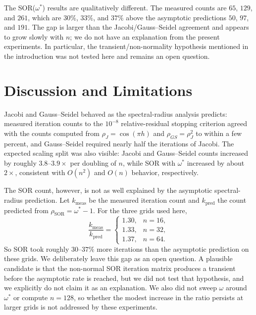 \documentclass[11pt]{article}
\begin{document}
The SOR($\omega^*$) results are qualitatively different. The measured counts are $65$, $129$, and $261$, which are $30\%$, $33\%$, and $37\%$ above the asymptotic predictions $50$, $97$, and $191$. The gap is larger than the Jacobi/Gauss--Seidel agreement and appears to grow slowly with $n$; we do not have an explanation from the present experiments. In particular, the transient/non-normality hypothesis mentioned in the introduction was not tested here and remains an open question.
\section{Discussion and Limitations}
Jacobi and Gauss--Seidel behaved as the spectral-radius analysis predicts: measured iteration counts to the \(10^{-8}\) relative-residual stopping criterion agreed with the counts computed from \(\rho_J=\cos(\pi h)\) and \(\rho_{GS}=\rho_J^2\) to within a few percent, and Gauss--Seidel required nearly half the iterations of Jacobi. The expected scaling split was also visible: Jacobi and Gauss--Seidel counts increased by roughly \(3.8\)--\(3.9\times\) per doubling of \(n\), while SOR with \(\omega^*\) increased by about \(2\times\), consistent with \(O(n^2)\) and \(O(n)\) behavior, respectively.

The SOR count, however, is not as well explained by the asymptotic spectral-radius prediction. Let \(k_{\mathrm{meas}}\) be the measured iteration count and \(k_{\mathrm{pred}}\) the count predicted from \(\rho_{\mathrm{SOR}}=\omega^*-1\). For the three grids used here,
\[
\frac{k_{\mathrm{meas}}}{k_{\mathrm{pred}}}=
\begin{cases}
1.30, & n=16,\\
1.33, & n=32,\\
1.37, & n=64.
\end{cases}
\]
So SOR took roughly \(30\)--\(37\%\) more iterations than the asymptotic prediction on these grids. We deliberately leave this gap as an open question. A plausible candidate is that the non-normal SOR iteration matrix produces a transient before the asymptotic rate is reached, but we did not test that hypothesis, and we explicitly do not claim it as an explanation. We also did not sweep \(\omega\) around \(\omega^*\) or compute \(n=128\), so whether the modest increase in the ratio persists at larger grids is not addressed by these experiments.
\end{document}
